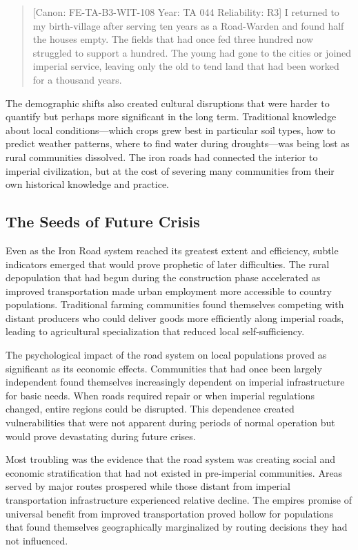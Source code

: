 \begin{quote}
{[}Canon: FE-TA-B3-WIT-108 \textbar{} Year: TA 044 \textbar{}
Reliability: R3{]} I returned to my birth-village after serving ten
years as a Road-Warden and found half the houses empty. The fields that
had once fed three hundred now struggled to support a hundred. The young
had gone to the cities or joined imperial service, leaving only the old
to tend land that had been worked for a thousand years.
\end{quote}

The demographic shifts also created cultural disruptions that were
harder to quantify but perhaps more significant in the long term.
Traditional knowledge about local conditions---which crops grew best in
particular soil types, how to predict weather patterns, where to find
water during droughts---was being lost as rural communities dissolved.
The iron roads had connected the interior to imperial civilization, but
at the cost of severing many communities from their own historical
knowledge and practice.

\subsection{The Seeds of Future
Crisis}\label{the-seeds-of-future-crisis}

Even as the Iron Road system reached its greatest extent and efficiency,
subtle indicators emerged that would prove prophetic of later
difficulties. The rural depopulation that had begun during the
construction phase accelerated as improved transportation made urban
employment more accessible to country populations. Traditional farming
communities found themselves competing with distant producers who could
deliver goods more efficiently along imperial roads, leading to
agricultural specialization that reduced local self-sufficiency.

The psychological impact of the road system on local populations proved
as significant as its economic effects. Communities that had once been
largely independent found themselves increasingly dependent on imperial
infrastructure for basic needs. When roads required repair or when
imperial regulations changed, entire regions could be disrupted. This
dependence created vulnerabilities that were not apparent during periods
of normal operation but would prove devastating during future crises.

Most troubling was the evidence that the road system was creating social
and economic stratification that had not existed in pre-imperial
communities. Areas served by major routes prospered while those distant
from imperial transportation infrastructure experienced relative
decline. The empire\textquotesingle s promise of universal benefit from
improved transportation proved hollow for populations that found
themselves geographically marginalized by routing decisions they had not
influenced.

